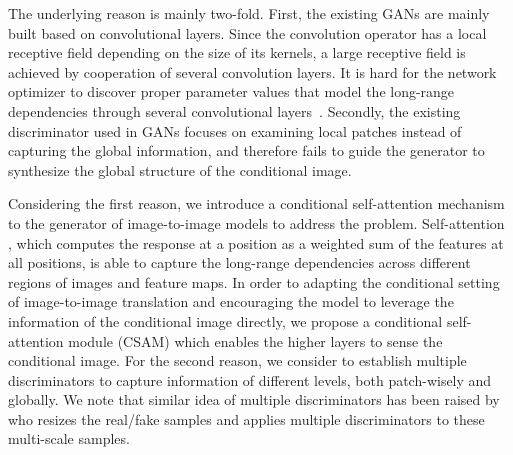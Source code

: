 The underlying reason is mainly two-fold.
%
First, the existing GANs are mainly built based on convolutional layers. Since the convolution operator has a local receptive field depending on the size of its kernels, a large receptive field is achieved by cooperation of several convolution layers. It is hard for the network optimizer to discover proper parameter values that model the long-range dependencies through several convolutional layers~\cite{SAGANs}.  
Secondly, the existing discriminator used in GANs focuses on examining local patches instead of capturing the global information, and therefore fails to guide the generator to synthesize the global structure of the conditional image. 


Considering the first reason, we introduce a conditional self-attention mechanism to the generator of image-to-image models to address the problem.
Self-attention \cite{Non-local, Attention, MachineReading, SAGANs}, which computes the response at a position as a weighted sum of the features at all positions, is able to capture the long-range dependencies across different regions of images and feature maps. In order to adapting the conditional setting of image-to-image translation and encouraging the model to leverage the information of the conditional image directly, we propose a conditional self-attention module (CSAM) which enables the higher layers to sense the conditional image. 
%
For the second reason, we consider to establish multiple discriminators to capture information of different levels, both patch-wisely and globally. We note that similar idea of multiple discriminators has been raised by \cite{LaplaceGANs, SGANs, StackGANs, CRN} who resizes the real/fake samples and applies multiple discriminators to these multi-scale samples. 





